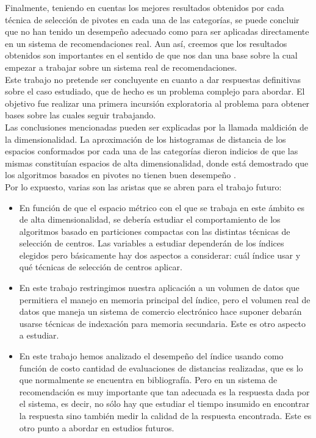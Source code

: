 Finalmente, teniendo en cuentas los mejores resultados obtenidos por cada t\'ecnica de selecci\'on de pivotes en cada una de las categor\'ias, se puede concluir que no han tenido un desempeño adecuado como  para ser aplicadas directamente en un sistema de recomendaciones real. Aun as\'i, creemos que los resultados obtenidos son importantes en el sentido de que nos dan una  base sobre la cual empezar a trabajar sobre un sistema real de recomendaciones.\\

Este trabajo no pretende ser concluyente en cuanto a dar respuestas definitivas sobre el caso estudiado, que de hecho es un problema complejo para abordar. El objetivo fue realizar una primera incursi\'on exploratoria al problema para obtener bases sobre las cuales seguir trabajando.\\

Las conclusiones mencionadas pueden ser explicadas por la llamada maldici\'on de la dimensionalidad. La aproximaci\'on de los histogramas de distancia de los espacios conformados por cada una de las categor\'ias dieron indicios de que las mismas constitu\'ian espacios de alta dimensionalidad, donde est\'a demostrado que los algoritmos basados en pivotes no tienen buen desempeño \cite{BNCsccc01}.\\

Por lo expuesto, varias son las aristas que se abren para el trabajo futuro:

\begin{itemize}
\item En funci\'on de que el espacio m\'etrico con el que se trabaja en este \'ambito es de alta dimensionalidad,  se deber\'ia estudiar el comportamiento de los algoritmos basado en particiones compactas con las distintas t\'ecnicas de selecci\'on de centros. Las variables a estudiar depender\'an de los \'indices elegidos pero b\'asicamente hay dos aspectos a considerar: cu\'al \'indice usar y  qu\'e t\'ecnicas de selecci\'on de centros aplicar.
\item  En este trabajo restringimos nuestra aplicaci\'on a un volumen de datos que permitiera el manejo en memoria principal del \'indice, pero el volumen real de datos que maneja un sistema de comercio electr\'onico hace suponer debar\'an usarse t\'ecnicas de indexaci\'on para memoria secundaria. Este es otro aspecto a estudiar.
\item En este trabajo hemos analizado el desempeño del \'indice usando como funci\'on de costo cantidad de evaluaciones de distancias realizadas, que es lo que normalmente se encuentra en bibliograf\'ia. Pero en un sistema de recomendaci\'on es muy importante que tan adecuada es la respuesta dada por el sistema, es decir, no s\'olo hay que estudiar el tiempo insumido en encontrar la respuesta sino tambi\'en medir la calidad de la respuesta encontrada. Este es otro punto a abordar en estudios futuros.
\end{itemize}